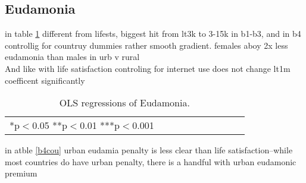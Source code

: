 \documentclass[10pt, letterpaper]{article}
\begin{document}
\begin{spacing}{1.4}
\subsection{Eudamonia}

in table \ref{regB} different from lifests, biggest hit from lt3k to 3-15k in b1-b3, and in b4
controllig for countruy dummies rather smooth gradient. females aboy 2x less
eudamonia than males in urb v rural\\

And like with life satisfaction controling for internet use does not change lt1m coefficent significantly 

\begin{table}[H]\centering\caption{OLS regressions of Eudamonia.} \label{regB} \begin{scriptsize} \begin{tabular}{p{2.2in}p{.6in}p{.6in}p{.6in}p{.6in}|p{.6in}p{.6in}|p{.6in}p{.6in}p{.6in}p{.6 in}p{.6in}p{.6 in}}\hline  \hline\multicolumn{4}{l}{*p$<$0.05 **p$<$0.01 ***p$<$0.001} \end{tabular}\end{scriptsize}\end{table}

in atble \ref{b4cou} urban eudamia penalty is less clear than life
satisfaction--while most countries do have urban penalty, there is a handful
with urban eudamonic premium



\end{spacing}
\end{document}
